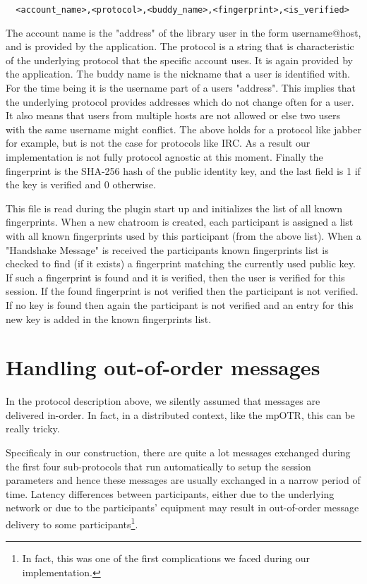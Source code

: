 {
\small
\centering
\begin{verbatim}
  <account_name>,<protocol>,<buddy_name>,<fingerprint>,<is_verified>
\end{verbatim}
}

The account name is the "address" of the library user in the form username@host, and is provided by the application.
The protocol is a string that is characteristic of the underlying protocol that the specific account uses.
It is again provided by the application.
The buddy name is the nickname that a user is identified with.
For the time being it is the username part of a users "address".
This implies that the underlying protocol provides addresses which do not change often for a user.
It also means that users from multiple hosts are not allowed or else two users with the same username might conflict.
The above holds for a protocol like jabber for example, but is not the case for protocols like IRC.
As a result our implementation is not fully protocol agnostic at this moment.
Finally the fingerprint is the SHA-256 hash of the public identity key, and the last field is 1 if the key is verified and 0 otherwise.

This file is read during the plugin start up and initializes the list of all known fingerprints.
When a new chatroom is created, each participant is assigned a list with all known fingerprints used by this participant (from the above list).
When a "Handshake Message" is received the participants known fingerprints list is checked to find (if it exists) a fingerprint matching the currently used public key.
If such a fingerprint is found and it is verified, then the user is verified for this session.
If the found fingerprint is not verified then the participant is not verified.
If no key is found then again the participant is not verified and an entry for this new key is added in the known fingerprints list.

\section{Handling out-of-order messages}
In the protocol description above, we silently assumed that messages are delivered in-order. In fact, in a distributed context, like the mpOTR, this can be really tricky.

Specificaly in our construction, there are quite a lot messages exchanged during the first four sub-protocols that run automatically to setup the session parameters and hence these messages are usually exchanged in a narrow period of time. Latency differences between participants, either due to the underlying network or due to the participants' equipment may result in out-of-order message delivery to some participants\footnote{In fact, this was one of the first complications we faced during our implementation.}.

